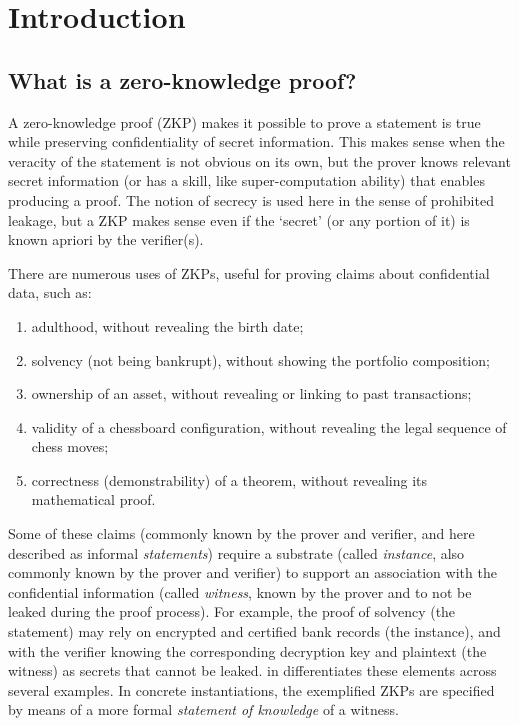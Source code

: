 \section{Introduction}
\label{security:intro}


\subsection{What is a zero-knowledge proof?}
\label{security:intro:what-is-a-ZK}


	A zero-knowledge proof (ZKP) makes it possible to prove a statement is true while preserving confidentiality of secret information.
	This makes sense when the veracity of the statement is not obvious on its own, but the prover knows relevant secret information (or has a skill, like super-computation ability) that enables producing a proof.
	The notion of secrecy is used here in the sense of prohibited leakage, but a ZKP makes sense even if the `secret' (or any portion of it) is known apriori by the verifier(s).


	There are numerous uses of ZKPs, useful for proving claims about confidential data, such as:
\begin{enumerate}
\item adulthood, without revealing the birth date;
\item solvency (not being bankrupt), without showing the portfolio composition;
\item ownership of an asset, without revealing or linking to past transactions;
\item validity of a chessboard configuration, without revealing the legal sequence of chess moves;
\item correctness (demonstrability) of a theorem, without revealing its mathematical proof.
\end{enumerate}


	Some of these claims (commonly known by the prover and verifier, and here described as informal \emph{statements}) require a substrate (called \emph{instance}, also commonly known by the prover and verifier) to support an association with the confidential information (called \emph{witness}, known by the prover and to not be leaked during the proof process).
	For example, the proof of solvency (the statement) may rely on encrypted and certified bank records (the instance), and with the verifier knowing the corresponding decryption key and plaintext (the witness) as secrets that cannot be leaked.
	 in  differentiates these elements across several examples.
	In concrete instantiations, the exemplified ZKPs are specified by means of a more formal \emph{statement of knowledge} of a witness.
	
